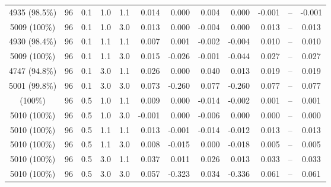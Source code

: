 \begin{longtable}[t]{cccccrrrrrrc}
4935 (98.5\%) & 96 & 0.1 & 1.0 & 1.1 & 0.014 & 0.000 & 0.004 & 0.000 & -0.001 & -- & -0.001\\
5009 (100\%) & 96 & 0.1 & 1.0 & 3.0 & 0.013 & 0.000 & -0.004 & 0.000 & 0.013 & -- & 0.013\\
4930 (98.4\%) & 96 & 0.1 & 1.1 & 1.1 & 0.007 & 0.001 & -0.002 & -0.004 & 0.010 & -- & 0.010\\
5009 (100\%) & 96 & 0.1 & 1.1 & 3.0 & 0.015 & -0.026 & -0.001 & -0.044 & 0.027 & -- & 0.027\\
4747 (94.8\%) & 96 & 0.1 & 3.0 & 1.1 & 0.026 & 0.000 & 0.040 & 0.013 & 0.019 & -- & 0.019\\
5001 (99.8\%) & 96 & 0.1 & 3.0 & 3.0 & 0.073 & -0.260 & 0.077 & -0.260 & 0.077 & -- & 0.077\\
\addlinespace
5010 (100\%) & 96 & 0.5 & 1.0 & 1.1 & 0.009 & 0.000 & -0.014 & -0.002 & 0.001 & -- & 0.001\\
5010 (100\%) & 96 & 0.5 & 1.0 & 3.0 & -0.001 & 0.000 & -0.006 & 0.000 & 0.000 & -- & 0.000\\
5010 (100\%) & 96 & 0.5 & 1.1 & 1.1 & 0.013 & -0.001 & -0.014 & -0.012 & 0.013 & -- & 0.013\\
5010 (100\%) & 96 & 0.5 & 1.1 & 3.0 & 0.008 & -0.015 & 0.000 & -0.018 & 0.005 & -- & 0.005\\
5010 (100\%) & 96 & 0.5 & 3.0 & 1.1 & 0.037 & 0.011 & 0.026 & 0.013 & 0.033 & -- & 0.033\\
5010 (100\%) & 96 & 0.5 & 3.0 & 3.0 & 0.057 & -0.323 & 0.034 & -0.336 & 0.061 & -- & 0.061\\
\bottomrule
\end{longtable}
\endgroup{}
